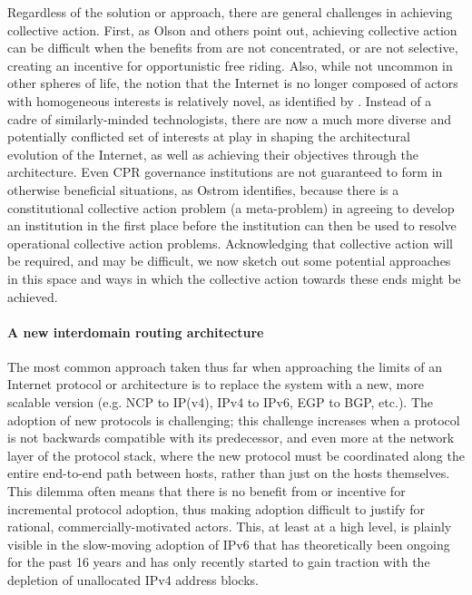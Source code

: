 Regardless of the solution or approach, there are general challenges in
achieving collective action. First, as Olson \cite{Olson:1982ly} and others
point out, achieving collective action can be difficult when the benefits from
are not concentrated, or are not selective, creating an incentive for
opportunistic free riding. Also, while not uncommon in other spheres of life,
the notion that the Internet is no longer composed of actors with homogeneous
interests is relatively novel, as identified by \cite{Clark:2005rt}. Instead of
a cadre of similarly-minded technologists, there are now a much more diverse
and potentially conflicted set of interests at play in shaping the
architectural evolution of the Internet, as well as achieving their objectives
through the architecture. Even CPR governance institutions are not guaranteed to
form in otherwise beneficial situations, as Ostrom \cite{Ostrom:1990fv}
identifies, because there is a constitutional collective action problem (a
meta-problem) in agreeing to develop an institution in the first place before
the institution can then be used to resolve operational collective action
problems. Acknowledging that collective action will be required, and may be
difficult, we now sketch out some potential approaches in this space and ways
in which the collective action towards these ends might be achieved.

\paragraph{A new interdomain routing architecture}

The most common approach taken thus far when approaching the limits of an
Internet protocol or architecture is to replace the system with a new, more
scalable version (e.g.  NCP to IP(v4), IPv4 to IPv6, EGP to BGP, etc.). The
adoption of new protocols is challenging; this challenge increases when a
protocol is not backwards compatible with its predecessor, and even more at the
network layer of the protocol stack, where the new protocol must be coordinated
along the entire end-to-end path between hosts, rather than just on the hosts
themselves. This dilemma often means that there is no benefit from or incentive
for incremental protocol adoption, thus making adoption difficult to justify
for rational, commercially-motivated actors. This, at least at a high
level, is plainly visible in the slow-moving adoption of IPv6
\cite{Cowie:2010vn} that has theoretically been ongoing for the past 16 years
\cite{rfc1883} and has only recently started to gain traction with the
depletion of unallocated IPv4 address blocks.

